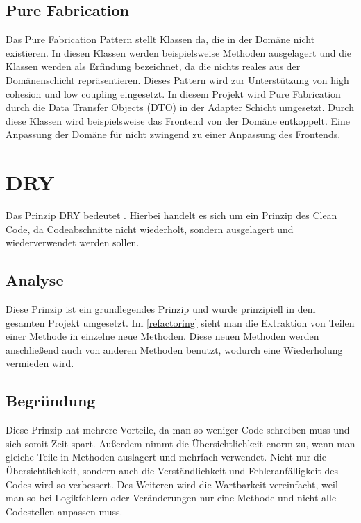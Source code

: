     \subsection{Pure Fabrication}
    Das Pure Fabrication Pattern stellt Klassen da, die in der Domäne nicht existieren. In diesen Klassen werden beispielsweise Methoden ausgelagert und die Klassen werden als Erfindung bezeichnet, da die nichts reales aus der Domänenschicht repräsentieren. Dieses Pattern wird zur Unterstützung von high cohesion und low coupling eingesetzt. In diesem Projekt wird Pure Fabrication durch die Data Transfer Objects (DTO) in der Adapter Schicht umgesetzt. Durch diese Klassen wird beispielsweise das Frontend von der Domäne entkoppelt. Eine Anpassung der Domäne für nicht zwingend zu einer Anpassung des Frontends.

\section{DRY}
Das Prinzip DRY bedeutet . Hierbei handelt es sich um ein Prinzip des Clean Code, da Codeabschnitte nicht wiederholt, sondern ausgelagert und wiederverwendet werden sollen.

    \subsection{Analyse}
    Diese Prinzip ist ein grundlegendes Prinzip und wurde prinzipiell in dem gesamten Projekt umgesetzt. Im \cref{refactoring} sieht man die Extraktion von Teilen einer Methode in einzelne neue Methoden. Diese neuen Methoden werden anschließend auch von anderen Methoden benutzt, wodurch eine Wiederholung vermieden wird.
    
    \subsection{Begründung}
    Diese Prinzip hat mehrere Vorteile, da man so weniger Code schreiben muss und sich somit Zeit spart. Außerdem nimmt die Übersichtlichkeit enorm zu, wenn man gleiche Teile in Methoden auslagert und mehrfach verwendet. Nicht nur die Übersichtlichkeit, sondern auch die Verständlichkeit und Fehleranfälligkeit des Codes wird so verbessert. Des Weiteren wird die Wartbarkeit vereinfacht, weil man so bei Logikfehlern oder Veränderungen nur eine Methode und nicht alle Codestellen anpassen muss.